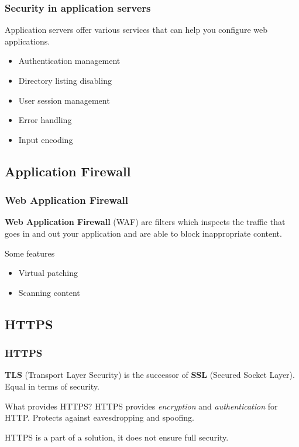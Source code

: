 \begin{frame}
\frametitle{Security in application servers}
Application servers offer various services that can help you configure
web applications.

\begin{itemize}
\item Authentication management
\item Directory listing disabling
\item User session management
\item Error handling
\item Input encoding
\end{itemize}
\end{frame}

\subsection{Application Firewall}

\begin{frame}
\frametitle{Web Application Firewall}
\textbf{Web Application Firewall} (WAF) are filters which inspects the traffic
that goes in and out your application and are able to block inappropriate
content.

\begin{block}{Some features}
\begin{itemize}
\item Virtual patching
\item Scanning content
\end{itemize}
\end{block}
\end{frame}

\subsection{HTTPS}

\begin{frame}
\frametitle{HTTPS}
\textbf{TLS} (Transport Layer Security) is the successor of \textbf{SSL}
(Secured Socket Layer).
Equal in terms of security.
\begin{block}{What provides HTTPS?}
HTTPS provides \emph{encryption} and \emph{authentication} for HTTP.
\newline Protects against eavesdropping and spoofing.
\end{block}
\vspace{1em}
HTTPS is a part of a solution, it does not ensure full security.
\end{frame}

